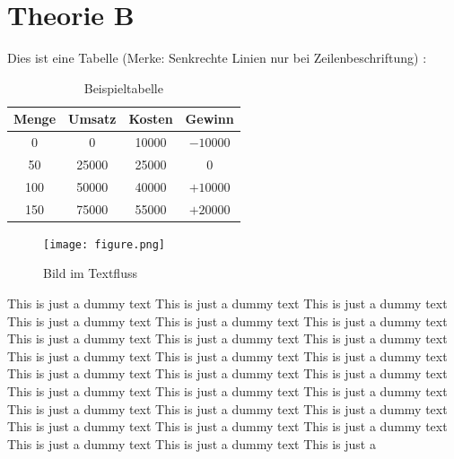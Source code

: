\section{Theorie B}
\label{sec:theorieB}

Dies ist eine Tabelle (Merke: Senkrechte Linien nur bei Zeilenbeschriftung)  :

\begin{table}[H]
	\centering
	\begin{tabular}{cccc}
		\toprule 
		Menge & Umsatz & Kosten & Gewinn \\ \midrule 
		0 & 0 & 10000 & $-10000$ \\ %
		50 & 25000 & 25000 & 0 \\ %
		100 & 50000 & 40000 & $+10000$ \\ %
		150 & 75000 & 55000 & $+20000$ \\
		\bottomrule 
	\end{tabular}
	\caption{Beispieltabelle}
	\label{tab:BSP}
\end{table}

\begin{figure}
	\centering
	\texttt{[image: figure.png]}
	\caption{Bild im Textfluss}
	\label{fig:test}
\end{figure}

This is just a dummy text This is just a dummy text This is just a dummy text This is just a dummy text This is just a dummy text This is just a dummy text
This is just a dummy text This is just a dummy text This is just a dummy text This is just a dummy text This is just a dummy text This is just a dummy text This is just a dummy text This is just a dummy text This is just a dummy text This is just a dummy text This is just a dummy text This is just a dummy text This is just a dummy text This is just a dummy text This is just a dummy text This is just a dummy text This is just a dummy text This is just a dummy text This is just a dummy text This is just a dummy text This is just a

